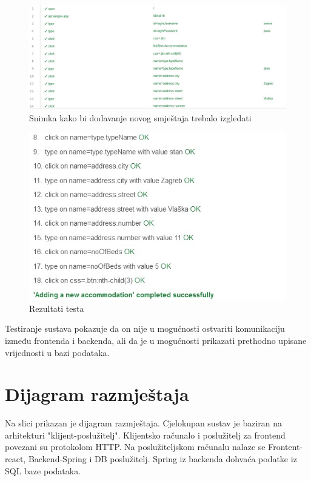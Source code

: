 			\begin{figure}[H]
				\includegraphics[width=\textwidth]{slike/addingANewAccTest.JPG}
				\caption{Snimka kako bi dodavanje novog smještaja trebalo izgledati}
				\label{addingANewAccTest}
			\end{figure}
			
			\begin{figure}[H]
				\includegraphics[width=\textwidth]{slike/addingANewAccResults.JPG}
				\caption{Rezultati testa}
				\label{addingANewAccResults}
			\end{figure}
			
			Testiranje sustava pokazuje da on nije u mogućnosti ostvariti komunikaciju između frontenda i backenda, ali da je u mogućnosti prikazati prethodno upisane vrijednosti u bazi podataka. 
			
			\eject 
		
		
		\section{Dijagram razmještaja}

		{Na slici prikazan je dijagram razmještaja. Cjelokupan sustav je baziran na arhitekturi "klijent-poslužitelj". Klijentsko računalo i poslužitelj za frontend povezani su protokolom HTTP. Na poslužiteljskom računalu nalaze se Frontent-react, Backend-Spring i DB poslužitelj. Spring iz backenda dohvaća podatke iz SQL baze podataka.}
			
